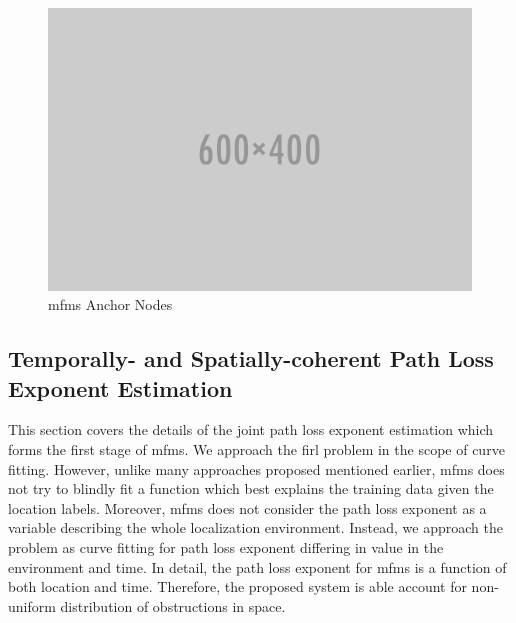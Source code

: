     \begin{figure}[thpb]
       \centering
       \includegraphics[width=\linewidth]{figures/placeholder.png}
       \caption{\label{fig:module}\gls{mfms} Anchor Nodes}
    \end{figure}

    \subsection{Temporally- and Spatially-coherent Path Loss Exponent Estimation}
    This section covers the details of the joint path loss exponent estimation  which forms the first stage of \gls{mfms}.
    We approach the \gls{firl} problem in the scope of curve fitting.
    However, unlike many approaches proposed mentioned earlier, \gls{mfms} does not try to blindly fit a function which best explains the training data given the location labels.
    Moreover, \gls{mfms} does not consider the path loss exponent as a variable describing the whole localization environment.
    Instead, we approach the problem as curve fitting for path loss exponent differing in value in the environment and time.
    In detail, the path loss exponent for \gls{mfms} is a function of both location and time.
    Therefore, the proposed system is able account for non-uniform distribution of obstructions in space.

